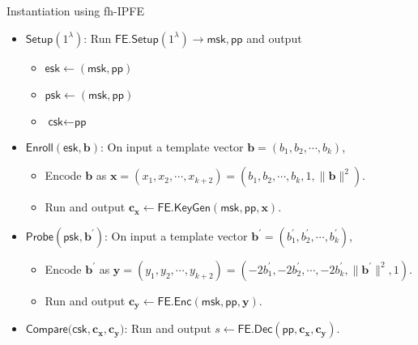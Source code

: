 \begin{frame}{Instantiation using fh-IPFE \cite{cryptoeprint:2023/481}}

\begin{itemize}

	\item<1-> $\textsf{Setup}(1^\lambda)$: Run $\textsf{FE.Setup}(1^\lambda) \to \textsf{msk}, \textsf{pp}$ and output 
	\begin{itemize}
		\item $\textsf{esk} \gets (\textsf{msk}, \textsf{pp})$
		\item $\textsf{psk} \gets (\textsf{msk}, \textsf{pp})$
		\item $\textsf{csk} \gets \textsf{pp}$
	\end{itemize}

	\item<2-> $\textsf{Enroll}(\textsf{esk}, \mathbf{b})$: On input a template vector $\mathbf{b} = (b_1, b_2, \cdots, b_k)$,
	\begin{itemize}
		\item Encode $\mathbf{b}$ as $\mathbf{x} = (x_1, x_2, \cdots, x_{k+2}) = (b_1, b_2, \cdots, b_k, 1, \|\mathbf{b}\|^2)$.
		\item Run and output $\mathbf{c_x} \gets \textsf{FE.KeyGen}(\textsf{msk}, \textsf{pp}, \mathbf{x})$.
	\end{itemize}

	\item<3-> $\textsf{Probe}(\textsf{psk}, \mathbf{b}^\prime)$: On input a template vector $\mathbf{b}^\prime = (b_1^\prime, b_2^\prime, \cdots, b_k^\prime)$,
	\begin{itemize}
		\item Encode $\mathbf{b}^\prime$ as $\mathbf{y} = (y_1, y_2, \cdots, y_{k+2}) = (-2b_1^\prime, -2b_2^\prime, \cdots, -2b_k^\prime, \|\mathbf{b}^\prime\|^2, 1)$.
		\item Run and output $\mathbf{c_y} \gets \textsf{FE.Enc}(\textsf{msk}, \textsf{pp}, \mathbf{y})$.
	\end{itemize}

	\item<4-> $\textsf{Compare}(\textsf{csk}, \mathbf{c_x}, \mathbf{c_y)}$: Run and output $s \gets \textsf{FE.Dec}(\textsf{pp}, \mathbf{c_x}, \mathbf{c_y})$.

\end{itemize}

\end{frame}


